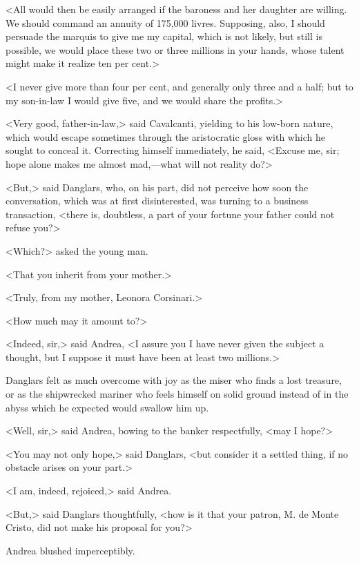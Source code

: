 <All would then be easily arranged if the baroness and her daughter are willing. We should command an annuity of 175,000 livres. Supposing, also, I should persuade the marquis to give me my capital, which is not likely, but still is possible, we would place these two or three millions in your hands, whose talent might make it realize ten per cent.> 

 <I never give more than four per cent, and generally only three and a half; but to my son-in-law I would give five, and we would share the profits.> 

 <Very good, father-in-law,> said Cavalcanti, yielding to his low-born nature, which would escape sometimes through the aristocratic gloss with which he sought to conceal it. Correcting himself immediately, he said, <Excuse me, sir; hope alone makes me almost mad,—what will not reality do?> 

 <But,> said Danglars, who, on his part, did not perceive how soon the conversation, which was at first disinterested, was turning to a business transaction, <there is, doubtless, a part of your fortune your father could not refuse you?> 

 <Which?> asked the young man. 

 <That you inherit from your mother.> 

 <Truly, from my mother, Leonora Corsinari.> 

 <How much may it amount to?> 

 <Indeed, sir,> said Andrea, <I assure you I have never given the subject a thought, but I suppose it must have been at least two millions.> 

 Danglars felt as much overcome with joy as the miser who finds a lost treasure, or as the shipwrecked mariner who feels himself on solid ground instead of in the abyss which he expected would swallow him up. 

 <Well, sir,> said Andrea, bowing to the banker respectfully, <may I hope?> 

 <You may not only hope,> said Danglars, <but consider it a settled thing, if no obstacle arises on your part.> 

 <I am, indeed, rejoiced,> said Andrea. 

 <But,> said Danglars thoughtfully, <how is it that your patron, M. de Monte Cristo, did not make his proposal for you?> 

 Andrea blushed imperceptibly. 

